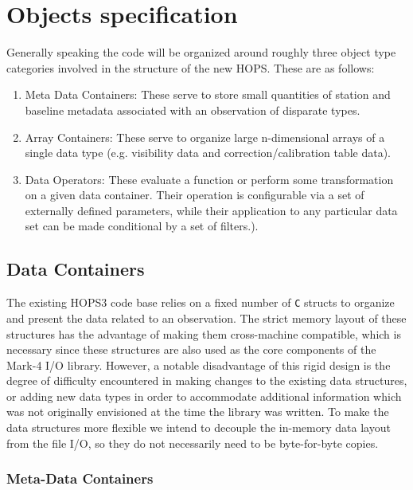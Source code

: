 \documentclass[hidelinks]{article}
\let\Oldsection\section
\renewcommand{\section}{\FloatBarrier\Oldsection}
\let\Oldsubsection\subsection
\renewcommand{\subsection}{\FloatBarrier\Oldsubsection}
\let\Oldsubsubsection\subsubsection
\renewcommand{\subsubsection}{\FloatBarrier\Oldsubsubsection}
\begin{document}
\section{Objects specification}

\label{sec:objects}


Generally speaking the code will be organized around roughly three object type categories involved in the structure of the new HOPS. These are as follows:

\begin{enumerate}
 \item Meta Data Containers: These serve to store small quantities of station and baseline metadata associated with an observation of disparate types.
 \item Array Containers: These serve to organize large n-dimensional arrays of a single data type (e.g. visibility data and correction/calibration table data). 
 \item Data Operators: These evaluate a function or perform some transformation on a given data container. Their operation is configurable via a set of externally defined parameters, while their application to any particular data set can be made conditional by a set of filters.).
\end{enumerate}

\subsection{Data Containers}

The existing HOPS3 code base relies on a fixed number of \texttt{C} structs to organize and present the data related to an observation. The strict memory layout of these structures has the advantage of making them cross-machine compatible, which is necessary since these structures are also used as the core components of the Mark-4 I/O library. However, a notable disadvantage of this rigid design is the degree of difficulty encountered in making changes to the existing data structures, or adding new data types in order to accommodate additional information which was not originally envisioned at the time the library was written. To make the data structures more flexible we intend to decouple the in-memory data layout from the file I/O, so they do not necessarily need to be byte-for-byte copies.

\subsubsection{Meta-Data Containers}
\end{document}
